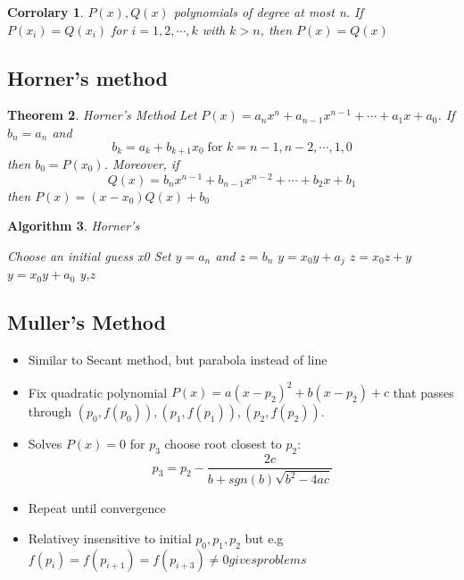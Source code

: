 \documentclass[12pt]{article}
\newtheorem{theorem}{Theorem}[subsection]
\newtheorem{cor}[theorem]{Corrolary}
\newtheorem{alg}[theorem]{Algorithm}
\begin{document}
\begin{cor}
$P(x), Q(x)$ polynomials of  degree at most n. If $P(x_i) = Q(x_i)$ for $i = 1,2,\cdots, k$ with $k>n$, then $P(x) = Q(x)$	
\end{cor}


\subsection{Horner's method}
\begin{theorem} {Horner's Method}
\newline Let $P(x) = a_nx^n +a_{n-1}x^{n-1} + \cdots +a_1x + a_0$. If $b_n = a_n$ and $$b_k = a_k +b_{k+1}x_0 \; \text{for $k = n-1, n-2, \cdots, 1,0$}$$
then $b_0 = P(x_0)$. Moreover, if 
$$ Q(x) = b_nx^{n-1} + b_{n-1}x^{n-2} + \cdots + b_2x + b_1$$
then $P(x) = (x - x_0)Q(x) + b_0$
\end{theorem}

\begin{alg}{Horner's }
	\begin{algorithmic}
	Choose an initial guess x0
	\State Set $y = a_n$ and $z = b_n$
	\State $y = x_0y + a_j$
	\State $z = x_0z + y$
	\EndFor	
	\State $y = x_0y + a_0$
	\State \Return y,z
	\end{algorithmic}
	
\end{alg}


\subsection{Muller's Method}
\begin{itemize}
	\item Similar to Secant method, but parabola instead of line
	\item Fix quadratic polynomial $P(x) = a(x-p_2)^2 +b(x - p_2) + c$ that passes through $(p_0,f(p_0)),(p_1,f(p_1)),(p_2,f(p_2))$.
	\item Solves $P(x) = 0$ for $p_3$ choose root closest to $p_2$:
	$$p_3 = p_2 - \frac{2c}{b + sgn(b)\sqrt{b^2 - 4ac}}$$
	\item Repeat until convergence
	\item Relativey insensitive to initial $p_0,p_1,p_2$ but e.g $f(p_i) = f(p_{i+1}) = f(p_{i+3}) \neq 0 gives problems$
\end{itemize}

\end{document}

